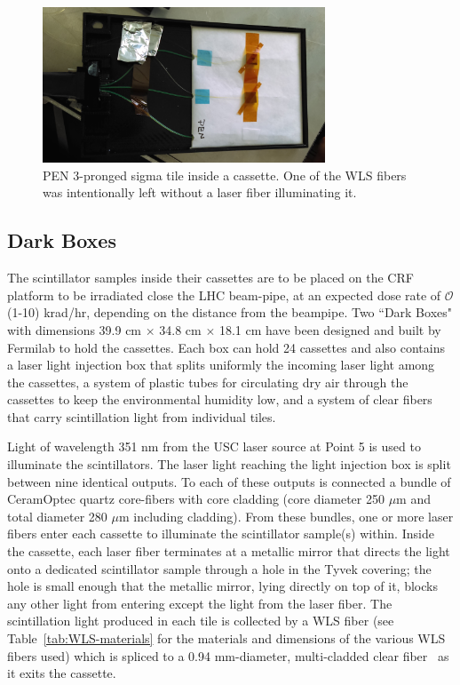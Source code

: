 \begin{figure}[hbtp]
\begin{center}
\includegraphics[width=0.75\textwidth]{figures/PENtile}
\caption{PEN 3-pronged sigma tile inside a cassette. One of the WLS fibers was intentionally left without a laser fiber illuminating it.}
\label{fig:PENtile}
\end{center}
\end{figure}

\subsection{Dark Boxes\label{sec:setup-darkboxes}}

The scintillator samples inside their cassettes are to be placed on the CRF platform to be irradiated close the LHC beam-pipe, at an expected dose rate of $\mathcal{O}$(1-10) krad/hr, depending on the distance from the beampipe. Two ``Dark Boxes" with dimensions 39.9 cm $\times$ 34.8 cm $\times$ 18.1 cm have been designed and built by Fermilab to hold the cassettes. Each box can hold 24 cassettes and also contains a laser light injection box that splits uniformly the incoming laser light among the cassettes, a system of plastic tubes for circulating dry air through the cassettes to keep the environmental humidity low, and a system of clear fibers that carry scintillation light from individual tiles.

Light of wavelength 351 nm from the USC laser source at Point 5 is used to illuminate the scintillators. The laser light reaching the light injection box is split between nine identical outputs. To each of these outputs is connected a bundle of CeramOptec quartz core-fibers with core cladding (core diameter 250 $\mu$m and total diameter 280 $\mu$m including cladding). From these bundles, one or more laser fibers enter each cassette to illuminate the scintillator sample(s) within. Inside the cassette, each laser fiber terminates at a metallic mirror that directs the light onto a dedicated scintillator sample through a hole in the Tyvek covering; the hole is small enough that the metallic mirror, lying directly on top of it, blocks any other light from entering except the light from the laser fiber. The scintillation light produced in each tile is collected by a WLS fiber (see Table~\ref{tab:WLS-materials} for the materials and dimensions of the various WLS fibers used) which is spliced to a 0.94 mm-diameter, multi-cladded clear fiber~\cite{KuraWLS} as it exits the cassette.

